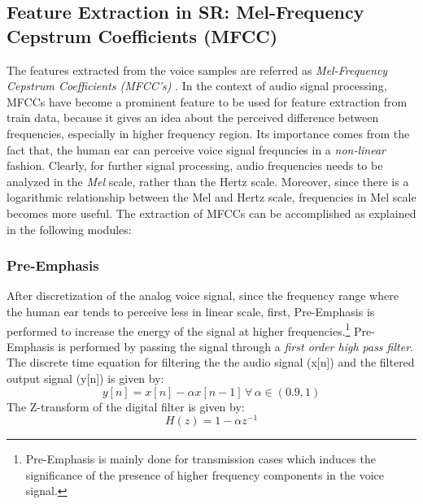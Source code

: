 \documentclass{article}
\begin{document}
{\subsection{Feature Extraction in SR: Mel-Frequency Cepstrum Coefficients (MFCC)}
The features extracted from the voice samples are referred as \textit{Mel-Frequency Cepstrum Coefficients (MFCC's)} \cite{7}. In the context of audio signal processing, MFCCs have become a prominent feature to be used for feature extraction from train data, because it gives an idea about the perceived difference between frequencies, especially in higher frequency region. Its importance comes from the fact that, the human ear can perceive voice signal frequncies in a \textit{non-linear} fashion. Clearly, for further signal processing, audio frequencies needs to be analyzed in the \textit{Mel} scale, rather than the {Hertz} scale. Moreover, since there is a logarithmic relationship between the Mel and Hertz scale, frequencies in Mel scale becomes more useful. The extraction of MFCCs can be accomplished as explained in the following modules:
\subsubsection{{Pre-Emphasis}} After discretization of the analog voice signal, since the frequency range where the human ear tends to perceive less in linear scale, first, Pre-Emphasis \cite{8} is performed to increase the energy of the signal at higher frequencies.\footnote{Pre-Emphasis is mainly done for transmission cases which induces the significance of the presence of higher frequency components in the voice signal.} Pre-Emphasis is performed by passing the signal through a \textit{first order high pass filter}. The discrete time equation for filtering the the audio signal (x[n]) and the filtered output signal (y[n]) is given by:
\begin{equation}
{y[n]} = {x[n]} - {\alpha x[n-1]} \, \forall\, {\alpha}\in (0.9,1) 
\end{equation}
The Z-transform of the digital filter is given by:
\begin{equation}
{H(z)} = 1-{\alpha z}^{-1}
\end{equation}
}
\end{document}
